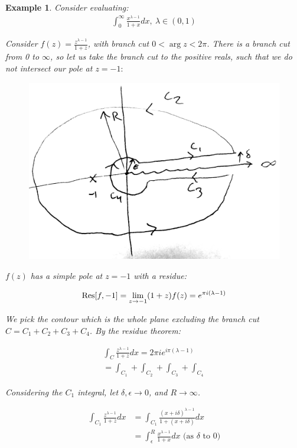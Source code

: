 \documentclass{article}
\newtheorem{ex}{Example}
\theoremstyle{definition}
\begin{document}
\begin{ex}
Consider evaluating:
\begin{align*}
\int_0^\infty \frac{x^{\lambda-1 }}{1+x} dx,\ \lambda \in (0,1)
\end{align*}

Consider $f(z) = \frac{z^{\lambda-1}}{1+z}$, with branch cut $0 < \arg z < 2 \pi $. There is  a branch cut from 0 to $\infty$, so let us take the branch cut to the positive reals, such that we do not intersect our pole at $z=-1:$

\begin{figure}[H]
\centering
\includegraphics[width=0.7\linewidth]{mycontour}
\caption{}
\label{fig:branchc}
\end{figure}

$f(z)$ has a simple pole at $z=-1$ with a residue:

\begin{align*}
\Res[f, -1] = \lim_{z \to -1} (1+z)f(z) = e^{\pi i (\lambda - 1)} 
\end{align*}

We pick the contour which is the whole plane excluding the branch cut $C = C_1 + C_2 + C_3 + C_4$. By the residue theorem:

\begin{align*}
\int_C \frac{z^{\lambda-1}}{1+z} dx = 2 \pi i e^{i \pi (\lambda-1)} \\ 
 = \int_{C_1} + \int_{C_2} + \int_{C_3} + \int_{C_4}
\end{align*}

Considering the $C_1$ integral, let $\delta, \epsilon \to 0$, and $R \to \infty$. 

\begin{align*}
\int_{C_1}\frac{z^{\lambda-1}}{1+z} dx &= \int_{C_1} \frac{(x+i\delta)^{\lambda-1}}{1+(x+i\delta)} dx \\ 
& = \int_\epsilon^R \frac{x^{\lambda-1 }}{1+x} dx \text{ (as $\delta$ to 0)} \\ 
\end{align*}


\end{ex}
\end{document}
